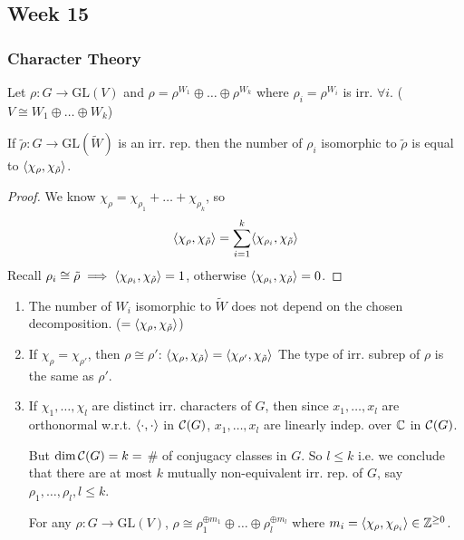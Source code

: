 \subsection{Week 15}
\subsubsection{Character Theory }

\begin{prop}
  Let $\rho: G\to \text{GL}(V)$ and
  $\rho = \rho^{W_1} \oplus \dots \oplus \rho^{W_k}$ where
  $\rho_i = \rho^{W_i}$ is irr. $\forall i$.
  ($V \cong W_1 \oplus\dots\oplus W_k$)
  
  If $\tilde{\rho}: G\to \text{GL}(\tilde{W})$ is an irr. rep. then the number
  of $\rho_i$ isomorphic to $\tilde{\rho}$ is equal to
  $\langle\chi_\rho, \chi_{\tilde{\rho}}\rangle$.
  \begin{proof}
    We know $\chi_\rho = \chi_{\rho_1} + \dots + \chi_{\rho_k}$, so
    \[
      \langle\chi_\rho, \chi_{\tilde{\rho}}\rangle
      = \sum_{i=1}^k \langle\chi_{\rho_i}, \chi_{\tilde{\rho}}\rangle
    \]
    Recall $\rho_i \cong \tilde{\rho} \implies
    \langle\chi_{\rho_i}, \chi_{\tilde{\rho}}\rangle = 1$, otherwise 
    $\langle\chi_{\rho_i}, \chi_{\tilde{\rho}}\rangle = 0$.
  \end{proof}
\end{prop}

\begin{remark} \mbox{}
  \begin{enumerate}
    \item The number of $W_i$ isomorphic to $\tilde{W}$ does not depend
      on the chosen decomposition. ($= \langle\chi_\rho, \chi_{\tilde{\rho}}\rangle$)
    \item If $\chi_\rho = \chi_{\rho'}$, then $\rho \cong \rho'$:
      $\langle\chi_\rho, \chi_{\tilde{\rho}}\rangle = \langle\chi_{\rho'}, \chi_{\tilde{\rho}}\rangle$
      The type of irr. subrep of $\rho$ is the same as $\rho'$.

    \item If $\chi_1, \dots, \chi_l$ are distinct irr. characters of $G$, then
      since $x_1, \dots, x_l$ are orthonormal w.r.t. $\langle\cdot,\cdot\rangle$ in
      $\mathcal{C}(G)$, $x_1, \dots, x_l$ are linearly indep. over $\mathbb{C}$ in $\mathcal{C}(G)$.

      But $\dim \mathcal{C}(G) = k =$ \# of conjugacy classes in $G$. So
      $l \le k$ i.e. we conclude that there are at most $k$ mutually
      non-equivalent irr. rep. of $G$, say $\rho_1, \dots, \rho_l, l \le k$.

      For any $\rho: G\to \text{GL}(V)$,
      $\rho \cong \rho_1^{\oplus m_1} \oplus\dots\oplus\rho_l^{\oplus m_l}$
      where $m_i = \langle\chi_\rho, \chi_{\rho_i}\rangle \in \mathbb{Z}^{\ge 0}$.
  \end{enumerate}
\end{remark}

